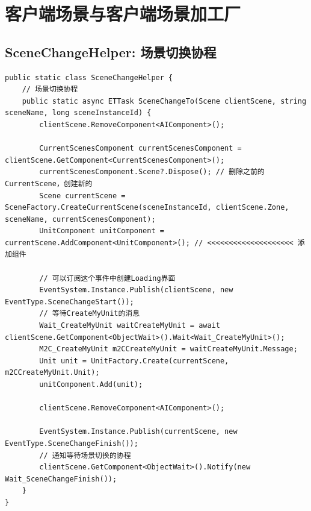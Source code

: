 \documentclass[9pt, b5paper]{article}
\begin{document}
\section{客户端场景与客户端场景加工厂}
\label{sec-3}
\subsection{SceneChangeHelper: 场景切换协程}
\label{sec-3-1}
\begin{verbatim}
public static class SceneChangeHelper {
    // 场景切换协程
    public static async ETTask SceneChangeTo(Scene clientScene, string sceneName, long sceneInstanceId) {
        clientScene.RemoveComponent<AIComponent>();

        CurrentScenesComponent currentScenesComponent = clientScene.GetComponent<CurrentScenesComponent>();
        currentScenesComponent.Scene?.Dispose(); // 删除之前的CurrentScene，创建新的
        Scene currentScene = SceneFactory.CreateCurrentScene(sceneInstanceId, clientScene.Zone, sceneName, currentScenesComponent);
        UnitComponent unitComponent = currentScene.AddComponent<UnitComponent>(); // <<<<<<<<<<<<<<<<<<<< 添加组件

        // 可以订阅这个事件中创建Loading界面
        EventSystem.Instance.Publish(clientScene, new EventType.SceneChangeStart());
        // 等待CreateMyUnit的消息
        Wait_CreateMyUnit waitCreateMyUnit = await clientScene.GetComponent<ObjectWait>().Wait<Wait_CreateMyUnit>();
        M2C_CreateMyUnit m2CCreateMyUnit = waitCreateMyUnit.Message;
        Unit unit = UnitFactory.Create(currentScene, m2CCreateMyUnit.Unit);
        unitComponent.Add(unit);

        clientScene.RemoveComponent<AIComponent>();

        EventSystem.Instance.Publish(currentScene, new EventType.SceneChangeFinish());
        // 通知等待场景切换的协程
        clientScene.GetComponent<ObjectWait>().Notify(new Wait_SceneChangeFinish());
    }
}
\end{verbatim}
\end{document}
